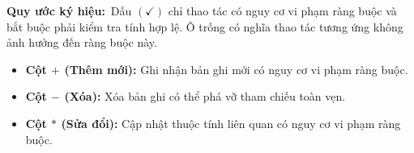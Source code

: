 \noindent\textbf{Quy ước ký hiệu:}\ Dấu $(\checkmark)$ chỉ thao tác có nguy cơ vi phạm ràng buộc và bắt buộc phải kiểm tra tính hợp lệ. Ô trống có nghĩa thao tác tương ứng không ảnh hưởng đến ràng buộc này.
\begin{itemize}[noitemsep,topsep=4pt]
    \item \textbf{Cột $+$ (Thêm mới):} Ghi nhận bản ghi mới có nguy cơ vi phạm ràng buộc.
    \item \textbf{Cột $-$ (Xóa):} Xóa bản ghi có thể phá vỡ tham chiếu toàn vẹn.
    \item \textbf{Cột $\ast$ (Sửa đổi):} Cập nhật thuộc tính liên quan có nguy cơ vi phạm ràng buộc.
\end{itemize}
